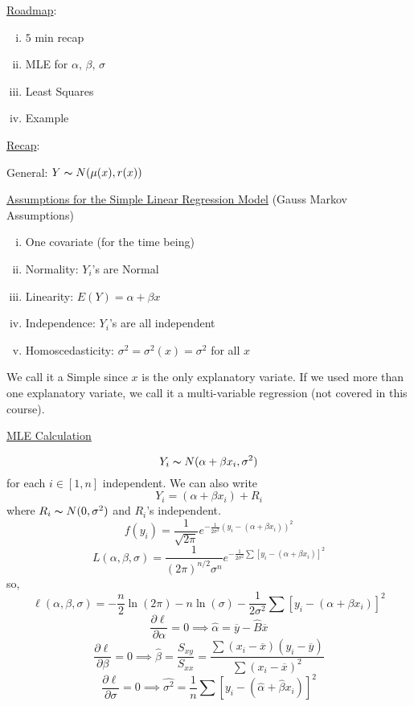 \underline{Roadmap}:
\begin{enumerate}[(i)]
    \item $ 5 $ min recap
    \item MLE for $ \alpha,\,\beta,\,\sigma $
    \item Least Squares
    \item Example
\end{enumerate}

\underline{Recap}:

General: $ Y \thicksim N(\mu(x),r(x)) $

\underline{Assumptions for the Simple Linear Regression Model}
(Gauss Markov Assumptions)
\begin{enumerate}[(i)]
    \item One covariate (for the time being)
    \item Normality: $ Y_i $'s are Normal
    \item Linearity: $ E(Y)=\alpha+\beta x $
    \item Independence: $ Y_i $'s are all independent
    \item Homoscedasticity: $ \sigma^2=\sigma^2(x)=\sigma^2 $ for all $ x $
\end{enumerate}
We call it a Simple since $ x $ is the only
explanatory variate. If we used more than one explanatory variate,
we call it a multi-variable regression (not covered in this course).

\underline{MLE Calculation}

\[ Y_i \thicksim N(\alpha+\beta x_i, \sigma^2) \]
for each $ i\in[1,n] $
independent. We can also write
\[ Y_i=(\alpha+\beta x_i)+R_i \]
where $ R_i \thicksim N(0,\sigma^2) $ and $ R_i $'s independent.
\[ f(y_i)=\frac{1}{\sqrt{2 \pi}}e^{-\frac{1}{2\sigma^2}(y_i-(\alpha+\beta x_i))^2}  \]
\[
    L(\alpha, \beta, \sigma)=
    \frac{1}{(2 \pi)^{n / 2} \sigma^{n}}
    e^{-\frac{1}{2 \sigma^{2}}
            \sum\left[y_{i}-\left(\alpha+\beta x_i\right)\right]^{2}}
\]
so,
\[ \ell(\alpha,\beta,\sigma)=-\frac{n}{2} \ln(2\pi)-n\ln(\sigma)-
    \frac{1}{2\sigma^2}\sum\left[y_{i}-\left(\alpha+\beta x_i\right)\right]^{2}  \]
\[ \frac{\partial\ell}{\partial\alpha}=0\implies
    \hat{\alpha}=\overline{y}-\hat{B}\overline{x} \]
\[ \frac{\partial \ell}{\partial \beta}=0\implies
    \hat{\beta}=\frac{S_{xy}}{S_{xx}}=\frac{\sum(x_i-\overline{x})(y_i-\overline{y})}
    {\sum (x_i-\overline{x})^2}  \]
\[ \frac{\partial\ell}{\partial \sigma}=0\implies
    \hat{\sigma^2}=\frac{1}{n} \sum \left[ y_i-(\hat{\alpha}+\hat{\beta}x_i) \right]^2 \]
